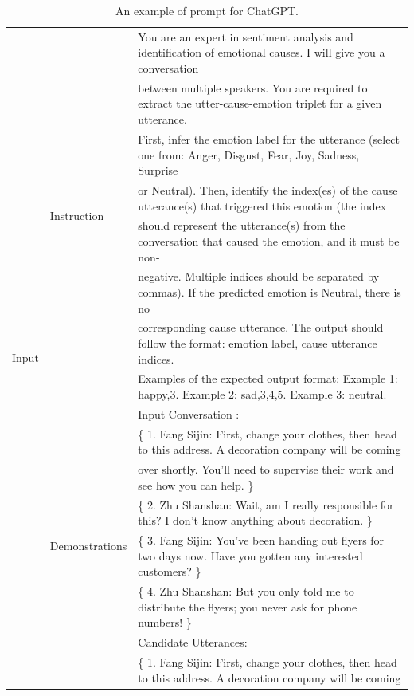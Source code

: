 \documentclass[11pt]{article}
\begin{document}
\begin{table}[t]
    \renewcommand{\arraystretch}{1.05}
  \caption{An example of prompt for ChatGPT.}
  \scriptsize
  \label{tab:prompts}
  \centering
  \begin{tabular}{lll}
    \toprule
    \multirow{28}{*}{Input} & \multirow{8}{*}{Instruction} & You are an expert in sentiment analysis and identification of emotional causes. I will give you a conversation \\
    & & between multiple speakers. You are required to extract the utter-cause-emotion triplet for a given utterance.  \\
    & &  First, infer the emotion label for the utterance (select one from: Anger, Disgust, Fear, Joy, Sadness, Surprise \\
    & &   or Neutral). Then, identify the index(es) of the cause utterance(s) that triggered this emotion (the index  \\
    & & should represent the utterance(s) from the conversation that caused the emotion, and it must be non- \\
    & &  negative. Multiple indices  should be separated by commas). If the predicted emotion is Neutral, there is no \\
    & & corresponding cause utterance. The output should follow the format: emotion label, cause utterance indices. \\
    & &  Examples of the expected output format: Example 1: happy,3. Example 2: sad,3,4,5. Example 3: neutral. \\
    \cline{2-3}
    & \multirow{20}{*}{Demonstrations}& Input Conversation :\\
    & & \{ 1. Fang Sijin: First, change your clothes, then head to this address. A decoration company will be coming \\ 
    & &  over shortly. You’ll need to supervise their work and see how you can help. \}\\
    & & \{ 2. Zhu Shanshan: Wait, am I really responsible for this? I don’t know anything about decoration. \} \\
    & & \{ 3. Fang Sijin: You’ve been handing out flyers for two days now. Have you gotten any interested customers? \} \\ 
    & & \{ 4. Zhu Shanshan: But you only told me to distribute the flyers; you never ask for phone numbers! \} \\
    & & Candidate Utterances:  \\
    & & \{ 1. Fang Sijin: First, change your clothes, then head to this address. A decoration company will be coming \\ 

\end{tabular}
\end{table}
\end{document}
